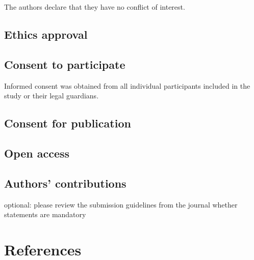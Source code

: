 \documentclass[
  man,floatsintext]{apa6}
\begin{document}
The authors declare that they have no conflict of interest.

\hypertarget{ethics-approval}{%
\subsection{Ethics approval}\label{ethics-approval}}

\hypertarget{consent-to-participate}{%
\subsection{Consent to participate}\label{consent-to-participate}}

Informed consent was obtained from all individual participants included in the study or their legal guardians.

\hypertarget{consent-for-publication}{%
\subsection{Consent for publication}\label{consent-for-publication}}

\hypertarget{open-access}{%
\subsection{Open access}\label{open-access}}

\hypertarget{authors-contributions}{%
\subsection{Authors' contributions}\label{authors-contributions}}

optional: please review the submission guidelines from the journal whether statements are mandatory

\newpage

\hypertarget{references}{%
\section{References}\label{references}}

\begingroup
\setlength{\parindent}{-0.5in}
\setlength{\leftskip}{0.5in}
\end{document}

